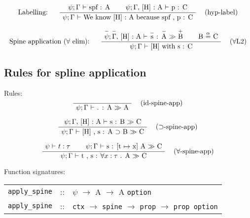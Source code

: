 \documentclass[twoside,a4paper]{article}
\theoremstyle{definition}
\begin{document}
\[
\AxiomC{$\psi ; \Gamma $ $\vdash$ spf : A}
\AxiomC{$\psi ; \Gamma ,$ [H] : A $\vdash$ p : C}
\LeftLabel{Labelling: \quad}
\RightLabel{\quad (hyp-label)}
\BinaryInfC{$\psi ; \Gamma $ $\vdash$ We know [H] : A because spf , p : C}
\DisplayProof
\]

\[
\AxiomC{$\overset{-}\psi ; \overset{-}\Gamma ,$ [H] : A $\vdash$ $\overset{-}{\text s}$ : $\overset{-}{\text A}$ $\gg$ $\overset{+}{\text B}$}
\AxiomC{B $\overset{\alpha}=$ C}
\LeftLabel{Spine application ($\forall$ elim): \quad}
\RightLabel{\quad ($\forall$L2)}
\BinaryInfC{$\psi ; \Gamma $ $\vdash$ [H] with s : C}
\DisplayProof
\]

\subsection{Rules for spline application}

Rules:
\[
\AxiomC{}
\AxiomC{}
\RightLabel{\quad (id-spine-app)}
\BinaryInfC{$\psi ; \Gamma $ $\vdash$ . : A $\gg$ A}
\DisplayProof
\]

\[
\AxiomC{$\psi ; \Gamma ,$ [H] : A $\vdash$ s : B $\gg$ C}
\RightLabel{\quad ($\supset$-spine-app)}
\UnaryInfC{$\psi ; \Gamma $ $\vdash$ [H] , s : A $\supset$ B $\gg$ C}
\DisplayProof
\]

\[
\AxiomC{$\psi \vdash$ $t : \tau$}
\AxiomC{$\psi ; \Gamma $ $\vdash$ s : [t $\mapsto$ x] A $\gg$ C}
\RightLabel{\quad ($\forall$-spine-app)}
\BinaryInfC{$\psi ; \Gamma $ $\vdash$ t , s : $\forall x :\tau$ . A $\gg$ C}
\DisplayProof
\]

Function signatures:

\begin{center}
\begin{tabular}{rll}

{\tt apply_spine} &::& $\psi$ $\rightarrow$ A $\rightarrow$ A {\tt option}
\\
{\tt apply_spine} &::& {\tt ctx} $\rightarrow$ {\tt spine} $\rightarrow$ {\tt prop} $\rightarrow$ {\tt prop option}

\end{tabular}
\end{center}



\end{document}
